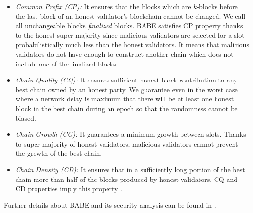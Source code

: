 \begin{itemize}
	\item \emph{Common Prefix (CP):} \label{item:common_prefix}
	 It ensures that the blocks which are $ k $-blocks before the last block of an honest validator's blockchain cannot be changed. We call  all unchangeable blocks  \emph{finalized} blocks. BABE satisfies CP property thanks to the honest super majority since malicious validators are selected for a slot probabilistically much less than the honest validators. It means that malicious validators do
	  not have enough 
	  to construct another chain which does not include one of the finalized blocks.
	\item \emph{Chain Quality (CQ):} \label{item:chain_quality} It ensures sufficient honest block contribution to any best chain owned by an honest party.	We guarantee even in the worst case where a network delay is maximum that there will be at least one honest block in the best chain during an epoch so that the randomness cannot be biased.
	\item \emph{Chain Growth (CG):} \label{item:chain_growth} It guarantees a minimum growth between slots. Thanks to super majority of honest validators, malicious validators cannot prevent the growth of the best chain.
	
	\item \emph{Chain Density (CD):} \label{item:chain_density} It ensures that in a sufficiently long portion of the best chain more than half of the blocks produced by honest validators. CQ and CD properties %
	imply this property \cite{Praos}.
\end{itemize}
Further details about BABE and  its security analysis can be found in \cite{babe}.

